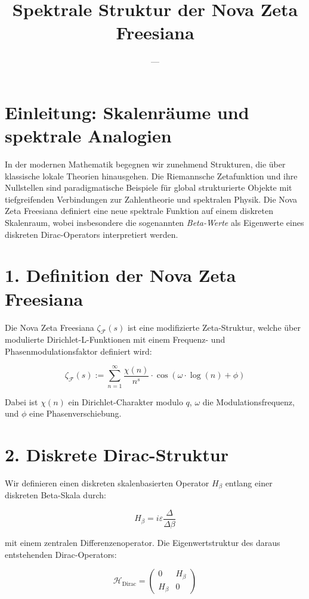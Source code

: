 \documentclass[11pt,a4paper]{article}
\title{\textbf{Spektrale Struktur der Nova Zeta Freesiana}}
\author{---}
\date{}
\begin{document}
\maketitle

\section*{Einleitung: Skalenräume und spektrale Analogien}

In der modernen Mathematik begegnen wir zunehmend Strukturen, die über klassische lokale Theorien hinausgehen. Die Riemannsche Zetafunktion und ihre Nullstellen sind paradigmatische Beispiele für global strukturierte Objekte mit tiefgreifenden Verbindungen zur Zahlentheorie und spektralen Physik. Die Nova Zeta Freesiana definiert eine neue spektrale Funktion auf einem diskreten Skalenraum, wobei insbesondere die sogenannten \emph{Beta-Werte} als Eigenwerte eines diskreten Dirac-Operators interpretiert werden.

\section*{1. Definition der Nova Zeta Freesiana}

Die Nova Zeta Freesiana $\zeta_{\mathcal{F}}(s)$ ist eine modifizierte Zeta-Struktur, welche über modulierte Dirichlet-L-Funktionen mit einem Frequenz- und Phasenmodulationsfaktor definiert wird:

\[
\zeta_{\mathcal{F}}(s) := \sum_{n=1}^{\infty} \frac{\chi(n)}{n^s} \cdot \cos\left(\omega \cdot \log(n) + \phi\right)
\]

Dabei ist $\chi(n)$ ein Dirichlet-Charakter modulo $q$, $\omega$ die Modulationsfrequenz, und $\phi$ eine Phasenverschiebung.

\section*{2. Diskrete Dirac-Struktur}

Wir definieren einen diskreten skalenbasierten Operator $H_\beta$ entlang einer diskreten Beta-Skala durch:

\[
H_\beta = i\varepsilon \frac{\Delta}{\Delta \beta}
\]

mit einem zentralen Differenzenoperator. Die Eigenwertstruktur des daraus entstehenden Dirac-Operators:

\[
\mathcal{H}_{\text{Dirac}} =
\begin{pmatrix}
0 & H_\beta \\
H_\beta & 0
\end{pmatrix}
\]
\end{document}
